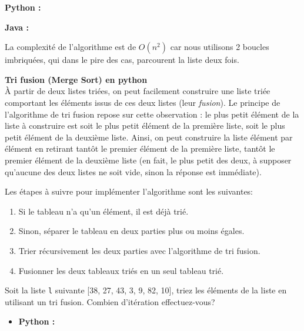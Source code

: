 \begin{Exercice} [20 minutes]
    \begin{solution}
        \textbf{Python :}
             
        \textbf{Java :}
            
    
    La complexité de l'algorithme est de $O(n^2)$ car nous utilisons 2 boucles imbriquées, qui dans le pire des cas, parcourent la liste deux fois.
    \end{solution}
    
\end{Exercice}

\begin{Exercice} [20 minutes] \textbf{Tri fusion (Merge Sort) en python} \\
    À partir de deux listes triées, on peut facilement construire une liste triée comportant les éléments issus de ces deux listes (leur \textit{fusion}). Le principe de l'algorithme de tri fusion repose sur cette observation : le plus petit élément de la liste à construire est soit le plus petit élément de la première liste, soit le plus petit élément de la deuxième liste. Ainsi, on peut construire la liste élément par élément en retirant tantôt le premier élément de la première liste, tantôt le premier élément de la deuxième liste (en fait, le plus petit des deux, à supposer qu'aucune des deux listes ne soit vide, sinon la réponse est immédiate). 
    
    Les étapes à suivre pour implémenter l'algorithme sont les suivantes:
    \begin{enumerate}
        \item Si le tableau n'a qu'un élément, il est déjà trié.
        \item Sinon, séparer le tableau en deux parties plus ou moins égales.
        \item Trier récursivement les deux parties avec l'algorithme de tri fusion.
        \item Fusionner les deux tableaux triés en un seul tableau trié.
    \end{enumerate}
    
    Soit la liste \lstinline{l} suivante [38, 27, 43, 3, 9, 82, 10], triez les éléments de la liste en utilisant un tri fusion. Combien d'itération effectuez-vous?
    
    \begin{itemize}
        \item \textbf{Python :}
            
    \end{itemize}
    

\end{Exercice}
